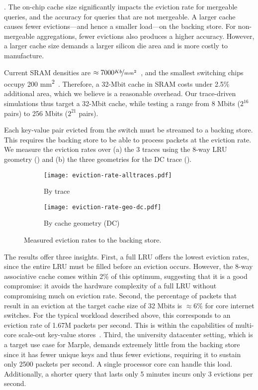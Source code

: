.  The on-chip cache size significantly impacts the
eviction rate for mergeable queries, and the accuracy for queries that are not
mergeable. A larger cache causes fewer evictions---and hence a smaller load---on
the backing store. For non-mergeable aggregations, fewer evictions also produces
a higher accuracy. However, a larger cache size demands a larger silicon die
area and is more costly to manufacture.

Current SRAM densities are
$\approx7000\nicefrac{Kb}{mm^2}$~\cite{sram_estimate}, and the smallest
switching chips occupy 200 \si{\milli\metre\squared}~\cite{gibb_parsing}.
Therefore, a 32-Mbit cache in SRAM costs under 2.5\% additional area, which we believe is a reasonable overhead. Our trace-driven simulations thus target a 32-Mbit cache, while testing
a range from 8 Mbits ($2^{16}$ pairs) to 256 Mbits ($2^{21}$ pairs).

 Each key-value pair evicted from the switch must be streamed to a backing store.
This requires the backing store to be able to process packets at the eviction rate. We measure the eviction rates over (a) the 3 traces using the 8-way LRU geometry () and (b) the three geometries for the DC trace ().
\begin{figure}[ht]
\centering
\vspace{-0.1in}
\begin{subfigure}[t]{0.48\columnwidth}
\raggedright
\texttt{[image: eviction-rate-alltraces.pdf]}
\caption{By trace}
\label{fig:eviction-traces}
\end{subfigure}
\begin{subfigure}[t]{0.48\columnwidth}
\raggedleft
\texttt{[image: eviction-rate-geo-dc.pdf]}
\caption{By cache geometry (DC)}
\label{fig:eviction-geo}
\end{subfigure}
\caption{Measured eviction rates to the backing store.}
\end{figure}

The results offer three insights. First, a full LRU offers the lowest eviction
rates, since the entire LRU must be filled before an eviction occurs. However,
the 8-way associative cache comes within 2\% of this optimum, suggesting that it
is a good compromise: it avoids the hardware complexity of a full LRU without
compromising much on eviction rate. 
Second, the percentage of packets that result in an eviction at the target cache size of 32 Mbits is $\approx6\%$ for core internet switches. For the typical workload described above, this corresponds to an eviction rate of 1.67M packets per second. This is within the capabilities of multi-core scale-out key-value stores~\cite{redis_benchmark, memcached_benchmark, redis_vs_memcached, redis_vs_memcached_update}.
Third, the university datacenter setting, which is a target use case for Marple,
demands extremely little from the backing store since it has fewer unique keys
and thus fewer evictions, requiring it to sustain only 2500 packets per
second. A single processor core can handle this load. Additionally, a shorter
query that lasts only 5 minutes incurs only 3 evictions per second.

